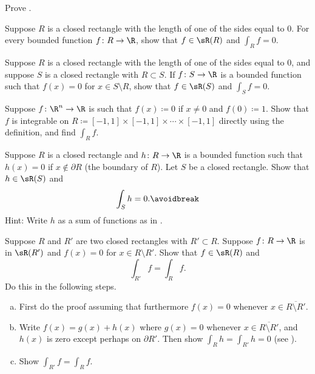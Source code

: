 \begin{exercise}
Prove .
\end{exercise}


\begin{exercise}
Suppose $R$ is a closed rectangle with the length of one of the sides equal to 0.
For every bounded function $f \colon R \to \R$, show that $f \in \sR(R)$ and $\int_R f = 0$.
\end{exercise}

\begin{exercise} \label{mv:zerosiderectangle}
Suppose $R$ is a closed rectangle with the length of one of the sides equal to 0,
and suppose $S$ is a closed rectangle with $R \subset S$.
If $f \colon S \to \R$
is a bounded function such that $f(x) = 0$ for $x \in S \setminus R$, show
that $f \in \sR(S)$ and $\int_S f = 0$.
\end{exercise}

\begin{exercise}
Suppose $f\colon \R^n \to \R$ is such that
$f(x) \coloneqq 0$ if $x\not= 0$ and $f(0) \coloneqq 1$.  Show that $f$ is integrable
on $R \coloneqq [-1,1] \times [-1,1] \times \cdots \times [-1,1]$ directly using the
definition, and find $\int_R f$.
\end{exercise}

\begin{exercise} \label{mv:zeroinside}
Suppose $R$ is a closed rectangle and $h \colon R \to \R$ is a bounded function
such that $h(x) = 0$ if $x \notin \partial R$ (the boundary of $R$).
Let $S$ be a closed rectangle.
Show that $h \in \sR(S)$ and
\begin{equation*}
\int_{S} h = 0 .
\avoidbreak
\end{equation*}
Hint: Write $h$ as a sum of functions as in .
\end{exercise}

\begin{exercise} \label{mv:zerooutside}
Suppose $R$ and $R'$ are two closed rectangles with $R' \subset R$.  Suppose $f \colon R \to \R$ is in $\sR(R')$
and $f(x) = 0$ for $x \in R \setminus R'$.
Show that $f \in \sR(R)$ and
\begin{equation*}
\int_{R'} f = \int_R f .
\end{equation*}
Do this in the following steps.
\begin{enumerate}[a)]
\item
First do the proof assuming that furthermore $f(x) = 0$ whenever $x
\in \overline{R \setminus R'}$.
\item
Write $f(x) = g(x) + h(x)$ where $g(x) = 0$ whenever $x
\in \overline{R \setminus R'}$, and $h(x)$ is zero except perhaps on
$\partial R'$.
Then show $\int_R h = \int_{R'} h = 0$ (see ).
\item
Show 
$\int_{R'} f = \int_R f$.
\end{enumerate}
\end{exercise}

